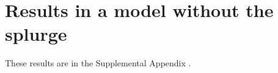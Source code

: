 \documentclass[qe,draft]{econsocart}
\theoremstyle{plain}
\theoremstyle{definition}
\begin{document}
%


\clearpage
\FloatBarrier
\section{Results in a model without the splurge}
\label{app:Model-without-splurge}

These results are in the Supplemental Appendix \citet{carroll2026welfareSupplement}.
\end{document}
